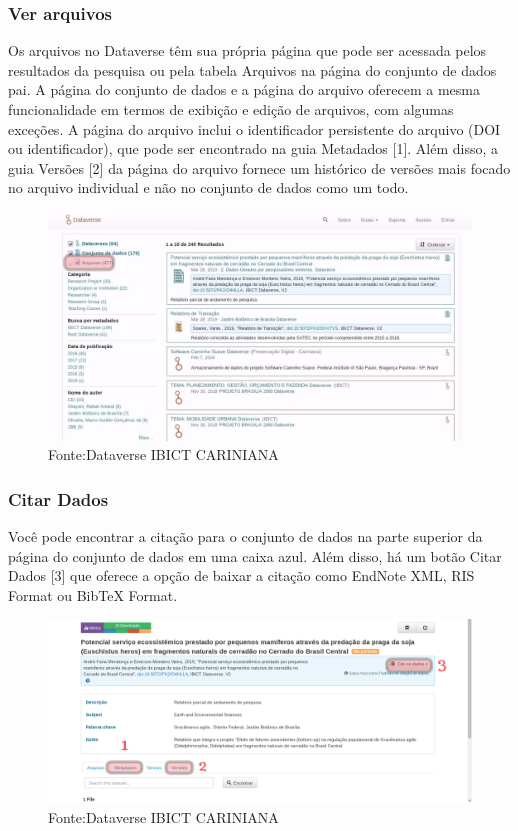 \documentclass[12pt,hidelinks]{article}
\begin{document}
	    \subsubsection{Ver arquivos}
	    
\qquad Os arquivos no Dataverse têm sua própria página que pode ser acessada pelos resultados da pesquisa ou pela tabela Arquivos na página do conjunto de dados pai. A página do conjunto de dados e a página do arquivo oferecem a mesma funcionalidade em termos de exibição e edição de arquivos, com algumas exceções. A página do arquivo inclui o identificador persistente do arquivo (DOI ou identificador), que pode ser encontrado na guia Metadados [1]. Além disso, a guia Versões [2] da página do arquivo fornece um histórico de versões mais focado no arquivo individual e não no conjunto de dados como um todo.
	    
\begin{figure}[H]
\centering
    \includegraphics[width=1.0\textwidth]{Prints/p111.jpg}
    \caption{Fonte:Dataverse IBICT CARINIANA}
    \label{print1}
\end{figure}
   
	    \subsubsection{Citar Dados}
	   
\qquad Você pode encontrar a citação para o conjunto de dados na parte superior da página do conjunto de dados em uma caixa azul. Além disso, há um botão Citar Dados [3] que oferece a opção de baixar a citação como EndNote XML, RIS Format ou BibTeX Format.
	    
\begin{figure}[H]
\centering
    \includegraphics[width=1.0\textwidth]{Prints/p222.png}
    \caption{Fonte:Dataverse IBICT CARINIANA}
    \label{print2}
\end{figure}
	    
\end{document}
